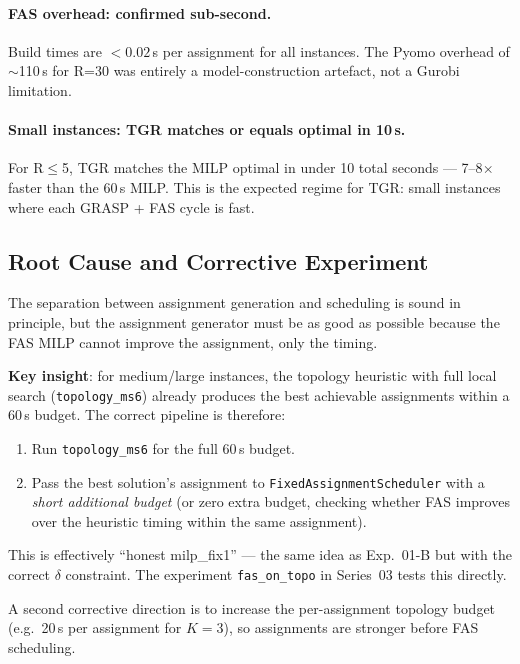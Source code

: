 \paragraph{FAS overhead: confirmed sub-second.}

Build times are $<0.02$\,s per assignment for all instances.
The Pyomo overhead of $\sim$110\,s for R=30 was entirely a model-construction
artefact, not a Gurobi limitation.

\paragraph{Small instances: TGR matches or equals optimal in 10\,s.}

For R$\leq$5, TGR matches the MILP optimal in under 10 total seconds —
7--8$\times$ faster than the 60\,s MILP.  This is the expected regime for
TGR: small instances where each GRASP + FAS cycle is fast.

\subsection{Root Cause and Corrective Experiment}
\label{exp:exp02-correction}

The separation between assignment generation and scheduling is sound in
principle, but the assignment generator must be as good as possible because
the FAS MILP cannot improve the assignment, only the timing.

\textbf{Key insight}: for medium/large instances, the topology heuristic with
full local search (\texttt{topology\_ms6}) already produces the best achievable
assignments within a 60\,s budget.  The correct pipeline is therefore:

\begin{enumerate}[noitemsep]
    \item Run \texttt{topology\_ms6} for the full 60\,s budget.
    \item Pass the best solution's assignment to \texttt{FixedAssignmentScheduler}
          with a \emph{short additional budget} (or zero extra budget, checking
          whether FAS improves over the heuristic timing within the same assignment).
\end{enumerate}

This is effectively ``honest milp\_fix1'' — the same idea as Exp.~01-B but
with the correct $\delta$ constraint.  The experiment \texttt{fas\_on\_topo} in
Series~03 tests this directly.

A second corrective direction is to increase the per-assignment topology budget
(e.g.\ 20\,s per assignment for $K=3$), so assignments are stronger before
FAS scheduling.

